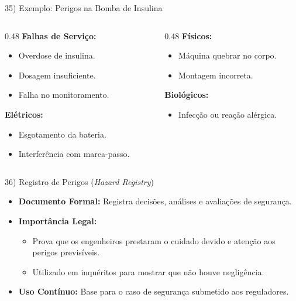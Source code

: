 \documentclass[aspectratio=169]{beamer}
\begin{document}
\begin{frame}{35) Exemplo: Perigos na Bomba de Insulina}
  \begin{columns}
    \begin{column}{0.48\textwidth}
      \textbf{Falhas de Serviço:}
      \begin{itemize}
        \item Overdose de insulina.
        \item Dosagem insuficiente.
        \item Falha no monitoramento.
      \end{itemize}
      \textbf{Elétricos:}
      \begin{itemize}
        \item Esgotamento da bateria.
        \item Interferência com marca-passo.
      \end{itemize}
    \end{column}
    \begin{column}{0.48\textwidth}
      \textbf{Físicos:}
      \begin{itemize}
        \item Máquina quebrar no corpo.
        \item Montagem incorreta.
      \end{itemize}
      \textbf{Biológicos:}
      \begin{itemize}
        \item Infecção ou reação alérgica.
      \end{itemize}
    \end{column}
  \end{columns}
\end{frame}

\begin{frame}{36) Registro de Perigos (\textit{Hazard Registry})}
  \begin{itemize}
    \item \textbf{Documento Formal:} Registra decisões, análises e avaliações de segurança.
    \item \textbf{Importância Legal:}
    \begin{itemize}
      \item Prova que os engenheiros prestaram o cuidado devido e atenção aos perigos previsíveis.
      \item Utilizado em inquéritos para mostrar que não houve \alert{negligência}.
    \end{itemize}
    \item \textbf{Uso Contínuo:} Base para o caso de segurança submetido aos reguladores.
  \end{itemize}
\end{frame}
\end{document}
